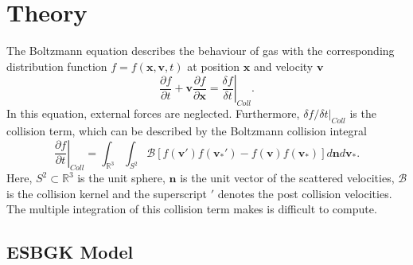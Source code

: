 \documentclass[aip,pof,amsmath,amssymb,preprint]{revtex4-1}
\begin{document}
\section{Theory}
The Boltzmann equation describes the behaviour of gas with the corresponding distribution function 
$f=f(\mathbf x, \mathbf v, t)$ at position $\mathbf x$ and velocity $\mathbf v$
\begin{equation}
\frac{\partial f}{\partial t} + \mathbf v \frac{\partial f}{\partial \mathbf x} = \left.\frac{\delta f}{\delta t}\right|_{Coll}.
\end{equation}
In this equation, external forces are neglected. Furthermore, $\left.\delta f/\delta t\right|_{Coll}$ is the 
collision term, which can be described by the Boltzmann collision integral
\begin{equation}
\left.\frac{\partial f}{\partial t}\right|_{Coll}=\int_{\mathbb{R}^3}\int_{S^2}\mathcal B
\left[f(\mathbf v')f(\mathbf v_*')-f(\mathbf v)f(\mathbf v_*)\right]d\mathbf n d\mathbf v_*.
\end{equation}
Here, $S^2\subset\mathbb{R}^3$ is the unit sphere, $\mathbf n$ is the unit vector of the scattered velocities, $\mathcal B$ is the collision
kernel and the superscript $'$ denotes the post collision velocities. The multiple integration of this collision term makes is difficult to compute. 

\subsection{ESBGK Model}
\end{document}
